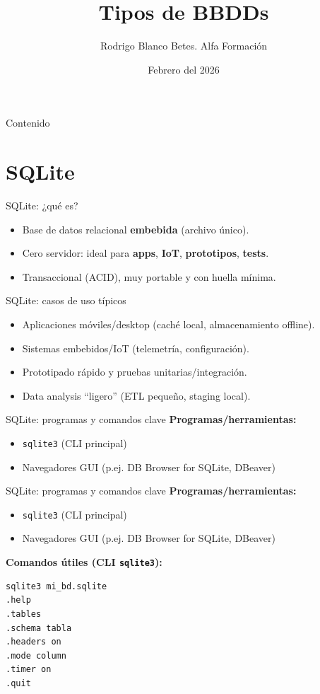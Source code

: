\documentclass{beamer}
\title{Tipos de BBDDs}
\author{Rodrigo Blanco Betes. Alfa Formación}
\date{Febrero del 2026}
\begin{document}
\begin{frame}
  \titlepage
\end{frame}

\begin{frame}{Contenido}
  \tableofcontents
\end{frame}

\section{SQLite}

\begin{frame}{SQLite: ¿qué es?}
\begin{itemize}
  \item Base de datos relacional \textbf{embebida} (archivo único).
  \item Cero servidor: ideal para \textbf{apps}, \textbf{IoT}, \textbf{prototipos}, \textbf{tests}.
  \item Transaccional (ACID), muy portable y con huella mínima.
\end{itemize}
\end{frame}

\begin{frame}{SQLite: casos de uso típicos}
\begin{itemize}
  \item Aplicaciones móviles/desktop (caché local, almacenamiento offline).
  \item Sistemas embebidos/IoT (telemetría, configuración).
  \item Prototipado rápido y pruebas unitarias/integración.
  \item Data analysis ``ligero'' (ETL pequeño, staging local).
\end{itemize}
\end{frame}

\begin{frame}{SQLite: programas y comandos clave}
\textbf{Programas/herramientas:}
\begin{itemize}
  \item \texttt{sqlite3} (CLI principal)
  \item Navegadores GUI (p.ej. DB Browser for SQLite, DBeaver)
\end{itemize}
\end{frame}

\begin{frame}[fragile]{SQLite: programas y comandos clave}
\textbf{Programas/herramientas:}
\begin{itemize}
  \item \texttt{sqlite3} (CLI principal)
  \item Navegadores GUI (p.ej. DB Browser for SQLite, DBeaver)
\end{itemize}

\textbf{Comandos útiles (CLI \texttt{sqlite3}):}
\begin{verbatim}
sqlite3 mi_bd.sqlite
.help
.tables
.schema tabla
.headers on
.mode column
.timer on
.quit
\end{verbatim}
\end{frame}
\end{document}
